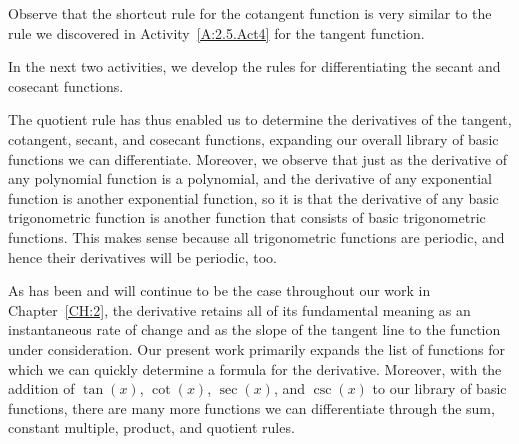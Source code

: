 Observe that the shortcut rule for the cotangent function is very similar to the rule we discovered in Activity~\ref{A:2.5.Act4} for the tangent function.


In the next two activities, we develop the rules for differentiating the secant and cosecant functions.



The quotient rule has thus enabled us to determine the derivatives of the tangent, cotangent, secant, and cosecant functions, expanding our overall library of basic functions we can differentiate.  Moreover, we observe that just as the derivative of any polynomial function is a polynomial, and the derivative of any exponential function is another exponential function, so it is that the derivative of any basic trigonometric function is another function that consists of basic trigonometric functions.  This makes sense because all trigonometric functions are periodic, and hence their derivatives will be periodic, too.

As has been and will continue to be the case throughout our work in Chapter~\ref{CH:2}, the derivative retains all of its fundamental meaning as an instantaneous rate of change and as the slope of the tangent line to the function under consideration.  Our present work primarily expands the list of functions for which we can quickly determine a formula for the derivative.  Moreover, with the addition of $\tan(x)$, $\cot(x)$, $\sec(x)$, and $\csc(x)$ to our library of basic functions, there are many more functions we can differentiate through the sum, constant multiple, product, and quotient rules.  



